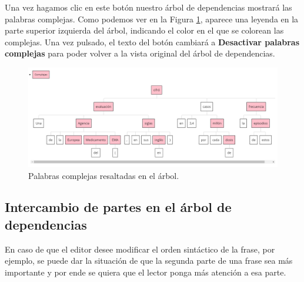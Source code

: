 Una vez hagamos clic en este botón nuestro árbol de dependencias mostrará las palabras complejas. Como podemos ver en la Figura \ref{fig:palabrasComplejas}, aparece una leyenda en la parte superior izquierda del árbol, indicando el color en el que se colorean las complejas. Una vez pulsado, el texto del botón cambiará a \textbf{Desactivar palabras complejas} para poder volver a la vista original del árbol de dependencias.  
	 \begin{figure}[h!]
	\centering
	
	
	\includegraphics[scale=0.7]{Imagenes/Figuras/palabrasComplejas}
	
	
	\caption{Palabras complejas resaltadas en el árbol.}
	\label{fig:palabrasComplejas}
\end{figure}
\subsection{Intercambio de partes en el árbol de dependencias}
En caso de que el editor desee modificar el orden sintáctico de la frase, por ejemplo, se puede dar la situación de que la segunda parte de una frase sea más importante y por ende se quiera que el lector ponga más atención a esa parte. 

